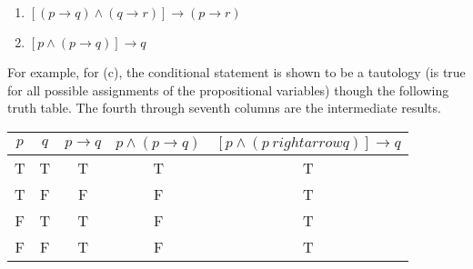 \documentclass[11pt]{article}
\begin{document}
\begin{enumerate}
\begin{enumerate}[label=(\alph*)]
\item $[(p \rightarrow q) \land (q \rightarrow r)] \rightarrow (p \rightarrow r)$
\item $[p \land (p \rightarrow q)] \rightarrow q$
\end{enumerate}
For example, for (c), the conditional statement is shown to be a tautology (is true
for all possible assignments of the propositional variables) though the following
truth table. The fourth through seventh columns are the intermediate results.
\begin{center}
\begin{tabular}{|c|c|c|c|c|}
\hline
$p$ & $q$ & $p \rightarrow q$ & $p \land (p \rightarrow q)$ & $[p \land (p \
rightarrow q)] \rightarrow q$\\
\hline
T & T & T & T & T\\
T & F & F & F & T\\
F & T & T & F & T\\
F & F & T & F & T\\
\hline
\end{tabular}
\end{center}
\end{enumerate}
\end{document}
